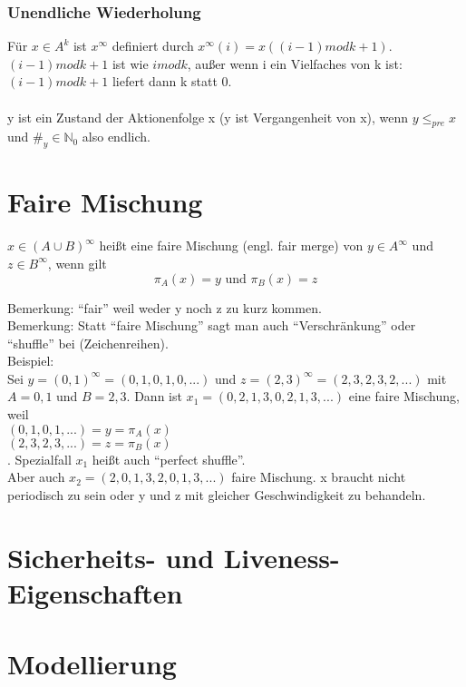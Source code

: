 \subsubsection*{Unendliche Wiederholung}
Für $x \in A^k$ ist \emph{$x^{\infty}$} definiert durch $x^{\infty}(i) = x((i-1)mod k + 1)$.\\
$(i-1)mod k + 1$ ist wie $i mod k$, außer wenn i ein Vielfaches von k ist:\\
$(i-1)mod k + 1$ liefert dann k statt 0.\\
\\
y ist ein Zustand der Aktionenfolge x (y ist Vergangenheit von x), wenn $y \leq_{pre} x$ und $\#_y \in \mathbb{N}_0$ also endlich.

\section{Faire Mischung}
$x \in (A \cup B)^\infty$ heißt eine faire Mischung (engl. fair merge) von $y \in A^\infty$ und $z \in B^\infty$, wenn gilt
\begin{equation*}
\pi_A(x) = y \text{ und } \pi_B(x) = z
\end{equation*}

Bemerkung: "`fair"' weil weder y noch z zu kurz kommen.\\
Bemerkung: Statt "`faire Mischung"' sagt man auch "`Verschränkung"' oder "`shuffle"' bei (Zeichenreihen).\\

Beispiel:\\
Sei $y = (0, 1)^\infty = (0, 1, 0, 1, 0, ...)$ und $z = (2,3)^\infty = (2, 3, 2, 3, 2, ...)$ mit $A = {0, 1}$ und $B = {2, 3}$. Dann ist $x_1 = (0, 2, 1, 3, 0, 2, 1, 3, ...)$ eine faire Mischung, weil \\
$(0,  1,  0,  1, ...) = y = \pi_A(x)$\\
$(2, 3, 2, 3, ...) = z = \pi_B(x)$\\.
Spezialfall $x_1$ heißt auch "`perfect shuffle"'.\\

Aber auch $x_2 = (2, 0, 1, 3, 2, 0, 1, 3, ...)$ faire Mischung. x braucht nicht periodisch zu sein oder y und z mit gleicher Geschwindigkeit zu behandeln.

\section{Sicherheits- und Liveness-Eigenschaften}

\section{Modellierung}